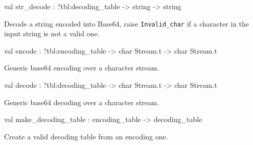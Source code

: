 \documentclass[11pt]{article}
\begin{document}
\label{val:XmlRpcBase64.str-underscoredecode}\begin{ocamldoccode}
val str_decode : ?tbl:decoding_table -> string -> string
\end{ocamldoccode}
\begin{ocamldocdescription}
Decode a string encoded into Base64, raise {\tt{Invalid\_char}} if a
	character in the input string is not a valid one.


\end{ocamldocdescription}




\label{val:XmlRpcBase64.encode}\begin{ocamldoccode}
val encode : ?tbl:encoding_table -> char Stream.t -> char Stream.t
\end{ocamldoccode}
\begin{ocamldocdescription}
Generic base64 encoding over a character stream.


\end{ocamldocdescription}




\label{val:XmlRpcBase64.decode}\begin{ocamldoccode}
val decode : ?tbl:decoding_table -> char Stream.t -> char Stream.t
\end{ocamldoccode}
\begin{ocamldocdescription}
Generic base64 decoding over a character stream.


\end{ocamldocdescription}




\label{val:XmlRpcBase64.make-underscoredecoding-underscoretable}\begin{ocamldoccode}
val make_decoding_table : encoding_table -> decoding_table
\end{ocamldoccode}
\begin{ocamldocdescription}
Create a valid decoding table from an encoding one.


\end{ocamldocdescription}
\end{document}
